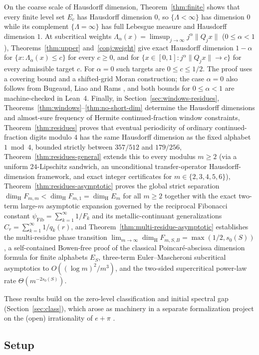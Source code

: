 \documentclass[11pt]{article}
\theoremstyle{definition}
\theoremstyle{remark}
\newcommand{\dimH}{\dim_{\mathrm{H}}}
\newcommand{\Lam}{\Lambda}
\begin{document}
On the coarse scale of Hausdorff dimension, Theorem~\ref{thm:finite} shows that
every finite level set $E_c$ has Hausdorff dimension $0$, so $\{\Lam<\infty\}$
has dimension $0$ while its complement $\{\Lam=\infty\}$ has full Lebesgue
measure and Hausdorff dimension $1$. At subcritical weights
$\Lam_\alpha(x)=\limsup_{j\to\infty}j^\alpha\|Q_jx\|$ ($0\le\alpha<1$),
Theorems~\ref{thm:upper} and~\ref{conj:weight} give exact Hausdorff dimension $1-\alpha$ for
$\{x:\Lam_\alpha(x)\le c\}$ for every $c\ge0$, and for
$\{x\in[0,1]:j^\alpha\|Q_jx\|\to c\}$ for every admissible target $c$.
For $\alpha=0$ such targets are $0\le c\le 1/2$.
The proof uses a covering bound and a shifted-grid Moran construction;
the case $\alpha=0$ also follows from Bugeaud, Liao and Rams \cite{BLR}, and
both bounds for $0\le\alpha<1$ are machine-checked in Lean~4. Finally, in
Section~\ref{sec:windows-residues}, Theorems~\ref{thm:windows}--\ref{thm:no-short-dim}
determine the Hausdorff dimensions and almost-sure frequency of Hermite
continued-fraction window constraints, Theorem~\ref{thm:residues} proves
that eventual periodicity of ordinary continued-fraction digits modulo $4$ has
the same Hausdorff dimension as the fixed alphabet $1\bmod 4$, bounded strictly
between $357/512$ and $179/256$, Theorem~\ref{thm:residues-general} extends this
to every modulus $m\ge2$ (via a uniform $24$-Lipschitz sandwich, an unconditional
transfer-operator Hausdorff-dimension framework, and exact integer certificates
for $m\in\{2,3,4,5,6\}$), Theorem~\ref{thm:residues-asymptotic} proves the
global strict separation $\dimH F_{m,m}<\dimH F_{m,1}=\dimH E_m$ for all $m\ge2$
together with the exact two-term large-$m$ asymptotic expansion governed by the
reciprocal Fibonacci constant $\psi_{\mathrm{Fib}}=\sum_{k=1}^\infty 1/F_k$ and
its metallic-continuant generalizations $C_r=\sum_{k=1}^\infty 1/q_k(r)$, and
Theorem~\ref{thm:multi-residue-asymptotic} establishes the multi-residue
phase transition $\lim_{m\to\infty}\dimH F_{m,S,B}=\max(1/2,s_0(S))$, a
self-contained Bowen-free proof of the classical Poincar\'e-abscissa dimension
formula for finite alphabets $E_S$,
three-term Euler--Mascheroni subcritical asymptotics to $O((\log m)^2/m^3)$,
and the two-sided supercritical power-law rate $\Theta(m^{-2s_0(S)})$.

These results build on the zero-level classification and initial spectral gap
(Section~\ref{sec:class}), which arose as machinery in a separate formalization
project on the (open) irrationality of $e+\pi$ \cite{Phase1}.

\subsection{Setup}
\end{document}
